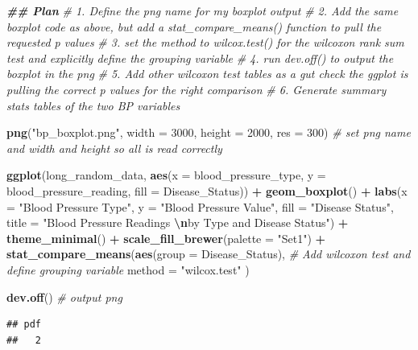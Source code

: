 \documentclass[
]{article}
\newenvironment{Shaded}{\begin{snugshade}}{\end{snugshade}}
\newcommand{\AttributeTok}[1]{\textcolor[rgb]{0.13,0.29,0.53}{#1}}
\newcommand{\CommentTok}[1]{\textcolor[rgb]{0.56,0.35,0.01}{\textit{#1}}}
\newcommand{\DecValTok}[1]{\textcolor[rgb]{0.00,0.00,0.81}{#1}}
\newcommand{\DocumentationTok}[1]{\textcolor[rgb]{0.56,0.35,0.01}{\textbf{\textit{#1}}}}
\newcommand{\FunctionTok}[1]{\textcolor[rgb]{0.13,0.29,0.53}{\textbf{#1}}}
\newcommand{\NormalTok}[1]{#1}
\newcommand{\SpecialCharTok}[1]{\textcolor[rgb]{0.81,0.36,0.00}{\textbf{#1}}}
\newcommand{\StringTok}[1]{\textcolor[rgb]{0.31,0.60,0.02}{#1}}
\begin{document}
\begin{Shaded}
\begin{Highlighting}[]
\DocumentationTok{\#\# Plan}
\CommentTok{\# 1. Define the png name for my boxplot output}
\CommentTok{\# 2. Add the same boxplot code as above, but add a stat\_compare\_means() function to pull the requested p values}
\CommentTok{\# 3. set the method to wilcox.test() for the wilcoxon rank sum test and explicitly define the grouping variable}
\CommentTok{\# 4. run dev.off() to output the boxplot in the png}
\CommentTok{\# 5. Add other wilcoxon test tables as a gut check the ggplot is pulling the correct p values for the right comparison}
\CommentTok{\# 6. Generate summary stats tables of the two BP variables}

\FunctionTok{png}\NormalTok{(}\StringTok{"bp\_boxplot.png"}\NormalTok{, }\AttributeTok{width =} \DecValTok{3000}\NormalTok{, }\AttributeTok{height =} \DecValTok{2000}\NormalTok{, }\AttributeTok{res =} \DecValTok{300}\NormalTok{) }\CommentTok{\# set png name and width and height so all is read correctly}

\FunctionTok{ggplot}\NormalTok{(long\_random\_data, }\FunctionTok{aes}\NormalTok{(}\AttributeTok{x =}\NormalTok{ blood\_pressure\_type, }\AttributeTok{y =}\NormalTok{ blood\_pressure\_reading, }\AttributeTok{fill =}\NormalTok{ Disease\_Status)) }\SpecialCharTok{+}
  \FunctionTok{geom\_boxplot}\NormalTok{() }\SpecialCharTok{+}
  \FunctionTok{labs}\NormalTok{(}\AttributeTok{x =} \StringTok{"Blood Pressure Type"}\NormalTok{, }\AttributeTok{y =} \StringTok{"Blood Pressure Value"}\NormalTok{, }\AttributeTok{fill =} \StringTok{"Disease Status"}\NormalTok{, }
       \AttributeTok{title =} \StringTok{"Blood Pressure Readings }\SpecialCharTok{\textbackslash{}n}\StringTok{by Type and Disease Status"}\NormalTok{) }\SpecialCharTok{+}
  \FunctionTok{theme\_minimal}\NormalTok{() }\SpecialCharTok{+}
  \FunctionTok{scale\_fill\_brewer}\NormalTok{(}\AttributeTok{palette =} \StringTok{"Set1"}\NormalTok{) }\SpecialCharTok{+}
  \FunctionTok{stat\_compare\_means}\NormalTok{(}\FunctionTok{aes}\NormalTok{(}\AttributeTok{group =}\NormalTok{ Disease\_Status), }\CommentTok{\# Add wilcoxon test and define grouping variable}
    \AttributeTok{method =} \StringTok{"wilcox.test"}
\NormalTok{  ) }

\FunctionTok{dev.off}\NormalTok{() }\CommentTok{\# output png}
\end{Highlighting}
\end{Shaded}

\begin{verbatim}
## pdf 
##   2
\end{verbatim}
\end{document}
